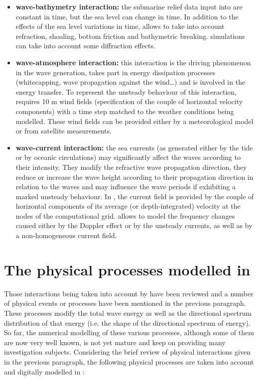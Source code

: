  \begin{itemize}
\item \textbf{wave-bathymetry interaction:} the submarine relief data input into \tomawac are constant in time, but the sea level can change in time. In addition to the effects of the sea level variations in time, \tomawac allows to take into account refraction, shoaling, bottom friction and bathymetric breaking. \tomawac simulations can take into account some diffraction effects.

 \item \textbf{wave-atmosphere interaction:} this interaction is the driving phenomenon in the wave generation, takes part in energy dissipation processes (whitecapping, wave propagation against the wind\dots ) and is involved in the energy transfer. To represent the unsteady behaviour of this interaction, \tomawac requires 10 m wind fields (specification of the couple of horizontal velocity components) with a time step matched to the weather conditions being modelled. These wind fields can be provided either by a meteorological model or from satellite measurements.

 \item \textbf{wave-current interaction:} the sea currents (as generated either by the tide or by oceanic circulations) may significantly affect the waves according to their intensity. They modify the refractive wave propagation direction, they reduce or increase the wave height according to their propagation direction in relation to the waves and may influence the wave periods if exhibiting a marked unsteady behaviour. In \tomawac, the current field is provided by the couple of horizontal components of its average (or depth-integrated) velocity at the nodes of the computational grid. \tomawac allows to model the frequency changes caused either by the Doppler effect or by the unsteady currents, as well as by a non-homogeneous current field.
\end{itemize}


\section{ The physical processes modelled in \tomawac}

 Those interactions being taken into account by \tomawac have been reviewed and a number of physical events or processes have been mentioned in the previous paragraph. These processes modify the total wave energy as well as the directional spectrum distribution of that energy (i.e. the shape of the directional spectrum of energy). So far, the numerical modelling of these various processes, although some of them are now very well known, is not yet mature and keep on providing many investigation subjects. Considering the brief review of physical interactions given in the previous paragraph, the following physical processes are taken into account and digitally modelled in \tomawac:

